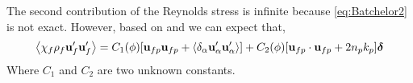 The second contribution of the Reynolds stress is infinite because \ref{eq:Batchelor2} is not exact. 
However, based on \citet{hill2001first} and \citet{zhang1994ensemble} we can expect that,  
\begin{equation*}
    \left<\chi_f \rho_f \textbf{u}_f' \textbf{u}_f'\right>
    =
    C_1(\phi) [\textbf{u}_{fp} \textbf{u}_{fp}
    + \left<\delta_\alpha \textbf{u}_\alpha'\textbf{u}_\alpha'\right> ]
    + C_2(\phi) [\textbf{u}_{fp}\cdot \textbf{u}_{fp} + 2 n_p k_p]\bm\delta
\end{equation*}
Where $C_1$ and $C_2$ are two unknown constants. 







